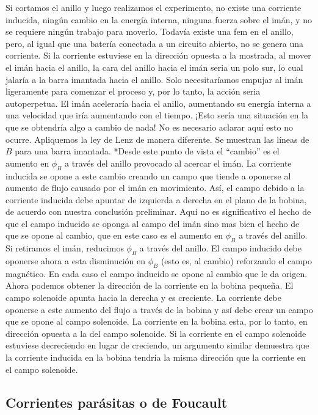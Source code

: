 \documentclass[11pt]{article}
\begin{document}
\begin{multicols}{2}
		Si cortamos el anillo y luego realizamos el experimento, no existe una corriente inducida, ningún cambio en la energía interna, ninguna fuerza sobre el imán, y no se requiere ningún trabajo para moverlo. Todavía existe una fem en el anillo, pero, al igual que una batería conectada a un circuito abierto, no se genera una corriente.
		Si la corriente estuviese en la dirección opuesta a la mostrada, al mover el imán hacia el anillo, la cara del anillo hacia el imán seria un polo sur, lo cual jalaría a la barra imantada hacia el anillo. Solo necesitaríamos empujar al imán ligeramente para comenzar el proceso y, por lo tanto, la acción seria autoperpetua. El imán aceleraría hacia el anillo, aumentando su energía interna a una velocidad que iría aumentando con el tiempo. ¡Esto sería una situación en la que se obtendría algo a cambio de nada! No es necesario aclarar aquí esto no ocurre.
		Apliquemos la ley de Lenz de manera diferente. Se muestran las líneas de $B$ para una barra imantada. *Desde este punto de vista el “cambio” es el aumento en $\phi _B$ a través del anillo provocado al acercar el imán. La corriente inducida se opone a este cambio creando un campo que tiende a oponerse al aumento de flujo causado por el imán en movimiento. Así, el campo debido a la corriente inducida debe apuntar de izquierda a derecha en el plano de la bobina, de acuerdo con nuestra conclusión preliminar.
		Aquí no es significativo el hecho de que el campo inducido se oponga al campo del imán sino mas bien el hecho de que se opone al cambio, que en este caso es el aumento en $\phi _B$ a través del anillo. Si retiramos el imán, reducimos $\phi _B$ a través del anillo. El campo inducido debe oponerse ahora a esta disminución en $\phi _B$ (esto es, al cambio) reforzando el campo magnético. En cada caso el campo inducido se opone al cambio que le da origen.
		Ahora podemos obtener la dirección de la corriente en la bobina pequeña. El campo solenoide apunta hacia la derecha y es creciente. La corriente debe oponerse a este aumento del flujo a través de la bobina y así debe crear un campo que se opone al campo solenoide. La corriente en la bobina esta, por lo tanto, en dirección opuesta a la del campo solenoide. Si la corriente en el campo solenoide estuviese decreciendo en lugar de creciendo, un argumento similar demuestra que la corriente inducida en la bobina tendría la misma dirección que la corriente en el campo solenoide.

	\subsection{Corrientes parásitas o de Foucault}


\end{multicols}
\end{document}

